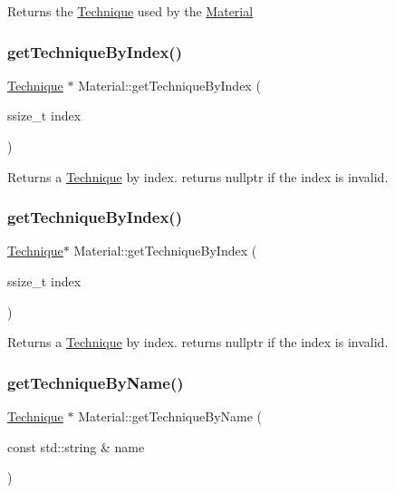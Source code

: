 Returns the \hyperlink{classTechnique}{Technique} used by the \hyperlink{classMaterial}{Material} \mbox{\label{classMaterial_a8561c6726a6be698bc61153e71cfcedc}} 
\subsubsection{\texorpdfstring{get\+Technique\+By\+Index()}{getTechniqueByIndex()}\hspace{0.1cm}{\footnotesize\ttfamily [1/2]}}
{\footnotesize\ttfamily \hyperlink{classTechnique}{Technique} $\ast$ Material\+::get\+Technique\+By\+Index (\begin{DoxyParamCaption}\item[{ssize\+\_\+t}]{index }\end{DoxyParamCaption})}

Returns a \hyperlink{classTechnique}{Technique} by index. returns {\ttfamily nullptr} if the index is invalid. \mbox{\label{classMaterial_a3f6e7d4e911f32fbbde7b7e9cf286316}} 
\subsubsection{\texorpdfstring{get\+Technique\+By\+Index()}{getTechniqueByIndex()}\hspace{0.1cm}{\footnotesize\ttfamily [2/2]}}
{\footnotesize\ttfamily \hyperlink{classTechnique}{Technique}$\ast$ Material\+::get\+Technique\+By\+Index (\begin{DoxyParamCaption}\item[{ssize\+\_\+t}]{index }\end{DoxyParamCaption})}

Returns a \hyperlink{classTechnique}{Technique} by index. returns {\ttfamily nullptr} if the index is invalid. \mbox{\label{classMaterial_a45e112d67c0e8a6590cb42b26f4bf7c9}} 
\subsubsection{\texorpdfstring{get\+Technique\+By\+Name()}{getTechniqueByName()}\hspace{0.1cm}{\footnotesize\ttfamily [1/2]}}
{\footnotesize\ttfamily \hyperlink{classTechnique}{Technique} $\ast$ Material\+::get\+Technique\+By\+Name (\begin{DoxyParamCaption}\item[{const std\+::string \&}]{name }\end{DoxyParamCaption})}

